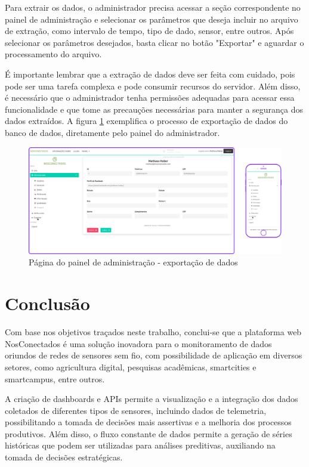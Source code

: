\documentclass[tcc,capa]{texufpel}
\begin{document}
Para extrair os dados, o administrador precisa acessar a seção correspondente no painel de administração e selecionar os parâmetros que deseja incluir no arquivo de extração, como intervalo de tempo, tipo de dado, sensor, entre outros. Após selecionar os parâmetros desejados, basta clicar no botão "Exportar" e aguardar o processamento do arquivo.

É importante lembrar que a extração de dados deve ser feita com cuidado, pois pode ser uma tarefa complexa e pode consumir recursos do servidor. Além disso, é necessário que o administrador tenha permissões adequadas para acessar essa funcionalidade e que tome as precauções necessárias para manter a segurança dos dados extraídos. A figura \ref{exportacao} exemplifica o processo de exportação de dados do banco de dados, diretamente pelo painel do administrador.

\begin{figure}[htbp]
  \centering \includegraphics[scale=.2]{assets/painelexportar.png}
  \caption{Página do painel de administração - exportação de dados}
  \label{exportacao}
\end{figure}
\newpage


\chapter{Conclusão}
Com base nos objetivos traçados neste trabalho, conclui-se que a plataforma web NosConectados é uma solução inovadora para o monitoramento de dados oriundos de redes de sensores sem fio, com possibilidade de aplicação em diversos setores, como agricultura digital, pesquisas acadêmicas, smartcities e smartcampus, entre outros.


A criação de dashboards e APIs permite a visualização e a integração dos dados coletados de diferentes tipos de sensores, incluindo dados de telemetria, possibilitando a tomada de decisões mais assertivas e a melhoria dos processos produtivos.
Além disso, o fluxo constante de dados permite a geração de séries históricas que podem ser utilizadas para análises preditivas, auxiliando na tomada de decisões estratégicas.
\end{document}
